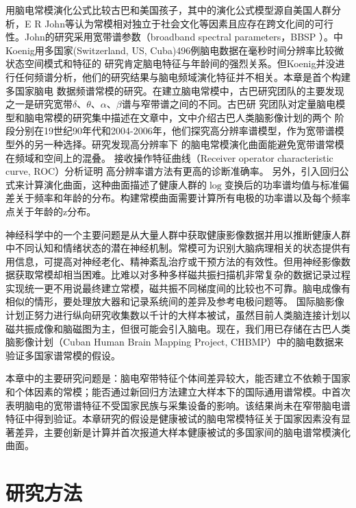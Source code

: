 \cite{alvarez1987eeg}用脑电常模演化公式比较古巴和美国孩子，其中的演化公式模型源自美国人群分析，E R John等认为常模相对独立于社会文化等因素且应存在跨文化间的可行性。John的研究采用宽带谱参数（broadband spectral parameters，BBSP
）。\cite{koenig2002millisecond}中Koenig用多国家(Switzerland, US, Cuba)496例脑电数据在毫秒时间分辨率比较微状态空间模式和特征的
研究肯定脑电特征与年龄间的强烈关系。但Koenig并没进行任何频谱分析，他们的研究结果与脑电频域演化特征并不相关。本章是首个构建多国家脑电
数据频谱常模的研究。在建立脑电常模中，古巴研究团队的主要发现之一是研究宽带$\delta、\theta、\alpha、\beta$谱与窄带谱之间的不同。古巴研
究团队对定量脑电模型和脑电常模的研究集中描述在文章\cite{hernandez-gonzalez_multimodal_2011}中，文中介绍古巴人类脑影像计划的两个
阶段分别在19世纪90年代和2004-2006年，他们探究高分辨率谱模型，作为宽带谱模型外的另一种选择。\cite{szava1994high}研究发现高分辨率下
的脑电常模演化曲面能避免宽带谱常模在频域和空间上的混叠。 接收操作特征曲线（Receiver operator characteristic curve, ROC）分析证明
高分辨率谱方法有更高的诊断准确率。 另外，\cite{amador1990spatiotemporal}引入回归公式来计算演化曲面，这种曲面描述了健康人群的$\log$变换后的功率谱均值与标准偏差关于频率和年龄的分布。构建常模曲面需要计算所有电极的功率谱以及每个频率点关于年龄的z分布。

神经科学中的一个主要问题是从大量人群中获取健康影像数据并用以推断健康人群中不同认知和情绪状态的潜在神经机制。常模可为识别大脑病理相关的状态提供有用信息，可提高对神经老化、精神紊乱治疗或干预方法的有效性。但用神经影像数据获取常模却相当困难。比难以对多种多样磁共振扫描机非常复杂的数据记录过程实现统一更不用说最终建立常模，磁共振不同梯度间的比较也不可靠。脑电成像有相似的情形，要处理放大器和记录系统间的差异及参考电极问题等。 国际脑影像计划正努力进行纵向研究收集数以千计的大样本被试，虽然目前人类脑连接计划以磁共振成像和脑磁图为主，但很可能会引入脑电。现在，我们用已存储在古巴人类脑影像计划（Cuban Human Brain Mapping Project, CHBMP）中的脑电数据来验证多国家谱常模的假设。

本章中的主要研究问题是：脑电窄带特征个体间差异较大，能否建立不依赖于国家和个体因素的常模；能否通过新回归方法建立大样本下的国际通用谱常模。\cite{john1977neurometrics}中首次表明脑电的宽带谱特征不受国家民族与采集设备的影响。该结果尚未在窄带脑电谱特征中得到验证。本章研究的假设是健康被试的脑电常模特征关于国家因素没有显著差异，主要创新是计算并首次报道大样本健康被试的多国家间的脑电谱常模演化曲面。

\section{研究方法}
